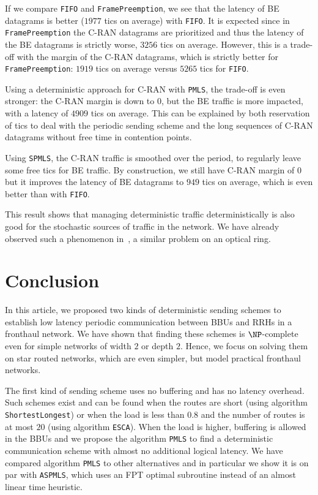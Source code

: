 \documentclass[a4paper,10pt]{journal}
\newcommand\shortestlongest{\texttt{ShortestLongest}\xspace}
\newcommand\ESCA{\texttt{ESCA}\xspace}
\newcommand\PMLS{\texttt{PMLS}\xspace}
\newcommand\ASPMLS{\texttt{ASPMLS}\xspace}
\newcommand\SPMLS{\texttt{SPMLS}\xspace}
\newcommand\FIFO{\texttt{FIFO}\xspace}
\newcommand\framepre{\texttt{FramePreemption}\xspace}
\begin{document}
     If we compare \FIFO and \framepre, we see that the latency of BE datagrams is better ($1977$ tics on average) with \FIFO. It is expected since in \framepre the C-RAN datagrams are prioritized and thus 
     the latency of the BE datagrams is strictly worse, $3256$ tics on average. However, this is a trade-off with the margin of the C-RAN datagrams, which is strictly better for \framepre: $1919$ tics on average versus $5265$ tics for \FIFO. 

     Using a deterministic approach for C-RAN with \PMLS, the trade-off is even stronger:
      the C-RAN margin is down to $0$, but the BE traffic is more impacted, with a latency of $4909$ tics on average. This can be explained by both reservation of tics to deal with the periodic sending scheme and the long sequences of C-RAN datagrams without free time in contention points.
     
     Using \SPMLS, the C-RAN traffic is smoothed over the period, to regularly leave some free tics for BE traffic. By construction, we still have C-RAN margin of $0$ but it improves the latency of BE datagrams to $949$ tics on average, which is even better than with \FIFO. 
     
      This result shows that managing deterministic traffic deterministically is also good for the stochastic sources of traffic in the network. We have already observed such a phenomenon in~\cite{DBLP:conf/ondm/BarthGS19}, a similar problem on an optical ring.
     


 \section{Conclusion}
 
	In this article, we proposed two kinds of deterministic sending schemes to establish low latency periodic communication between BBUs and RRHs in a fronthaul network. We have shown 
    that finding these schemes is $\NP$-complete even for simple networks of width $2$ or depth $2$. Hence, we focus on solving them on star routed networks, which are even simpler, 
    but model practical fronthaul networks.
    
    The first kind of sending scheme uses no buffering and has no latency overhead. Such schemes exist and can be found when the routes are short (using algorithm \shortestlongest) or when the load is less than $0.8$ and the number of routes is at most $20$ (using algorithm \ESCA).  
	When the load is higher, buffering is allowed in the BBUs and we propose the algorithm \PMLS to find a deterministic communication scheme with almost no additional logical latency.
    We have compared algorithm \PMLS to other alternatives and in particular we show it is on par with \ASPMLS, which uses an FPT optimal subroutine instead of an almost linear time heuristic.
\end{document}
